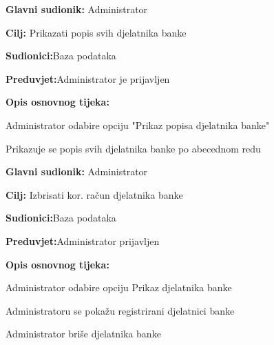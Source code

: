 \noindent {}
\begin{packed_item}
	
	\item \textbf{Glavni sudionik: }{Administrator}
	\item  \textbf{Cilj:} {Prikazati popis svih djelatnika banke}
	\item  \textbf{Sudionici:}{Baza podataka} 
	\item  \textbf{Preduvjet:}{Administrator je prijavljen}
	\item  \textbf{Opis osnovnog tijeka:}
	
	\item[] \begin{packed_enum}
		
		\item {Administrator odabire opciju "Prikaz popisa djelatnika banke"}
		\item {Prikazuje se popis svih djelatnika banke po abecednom redu}
		\end{packed_enum}
\end{packed_item}

\eject 
\noindent {}
\begin{packed_item}
	
	\item \textbf{Glavni sudionik: }{Administrator}
	\item  \textbf{Cilj:} {Izbrisati kor. račun djelatnika banke}
	\item  \textbf{Sudionici:}{Baza podataka}
	\item  \textbf{Preduvjet:}{Administrator prijavljen}
	\item  \textbf{Opis osnovnog tijeka:}
	
	\item[] \begin{packed_enum}
		
		\item {Administrator odabire opciju Prikaz djelatnika banke}
		\item {Administratoru se pokažu registrirani djelatnici banke}
		\item {Administrator briše djelatnika banke}
		
	\end{packed_enum}
	
\end{packed_item}

